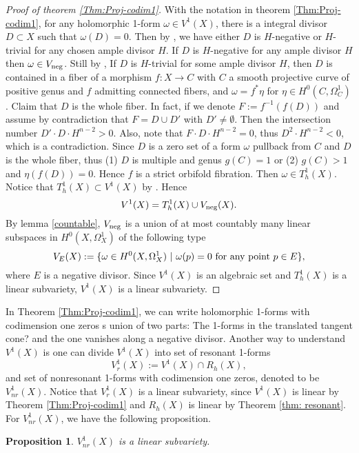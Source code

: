 \documentclass[a4paper,12pt,reqno]{amsart}
\theoremstyle{plain}
\newtheorem{proposition}[theorem]{Proposition}
\theoremstyle{remark}
\begin{document}
\begin{proof}[Proof  of theorem \ref{Thm:Proj-codim1}]
With the notation in theorem \ref{Thm:Proj-codim1},  for any holomorphic 1-form $\omega\in V^1(X)$, there is a integral divisor $D\subset X$ such that $\omega(D)=0$. Then by \cite[theorem 2]{Sp88}, we have either $D$ is $H$-negative or $H$-trivial for any chosen ample divisor $H$. If $D$ is $H$-negative for any ample divisor $H$ then $\omega\in V_{\textnormal{neg}}$. Still by \cite[theorem 2]{Sp88}, If $D$ is $H$-trivial for some ample divisor $H$, then $D$ is contained in a fiber of a morphism $f: X\to C$ with $C$ a smooth projective curve of positive genus and $f$ admitting connected fibers, and $\omega=f^*\eta$ for $\eta\in H^0(C, \Omega_C^1)$. Claim that $D$ is the whole fiber. In fact, if we denote $F:=f^{-1}(f(D))$ and assume by contradiction that $F=D\cup D'$ with $D'\not=\emptyset$. Then the intersection number $D'\cdot D\cdot H^{n-2}>0$. Also, note that $F\cdot D\cdot H^{n-2}=0$, thus $D^2\cdot H^{n-2}<0$, which is a contradiction. Since $D$ is a zero set of a form $\omega$ pullback from $C$ and $D$ is the whole fiber, thus (1) $D$ is multiple and genus $g(C)=1$ or (2) $g(C)>1$ and $\eta(f(D))=0$. Hence $f$ is a strict orbifold fibration. Then $\omega\in T_h^1(X)$. Notice that $T_h^1(X)\subset V^1(X)$ by \cite{GL87}. Hence $$V^1(X)= T_h^1(X)\cup V_{\textnormal{neg}}(X).
$$
By lemma \ref{countable}, $V_{\textnormal{neg}}$ is a union of at most countably many linear subspaces in $H^0(X, \Omega_X^1)$ of the following type $$V_E(X):=\{\omega\in H^0(X, \Omega_X^1)\ |\ \omega(p)=0\  \textnormal{for any point}\ p\in E\},$$ where $E$ is a negative divisor. Since $V^1(X)$ is an algebraic set and $T_h^1(X)$ is a linear subvariety, $V^1(X)$ is a linear subvariety.
 \end{proof} 
 
 In Theorem \ref{Thm:Proj-codim1}, we can write holomorphic 1-forms with codimension one zeros s union of two parts: The 1-forms in the {\color{red} translated tangent cone?} and the one vanishes along a negative divisor.  Another way to understand  $V^1(X)$ is one can divide $V^1(X)$ into set of resonant 1-forms $$V^1_r(X):=V^1(X)\cap R_h(X),$$ and set of nonresonant 1-forms with codimension one zeros, denoted to be $V^1_{nr}(X)$. Notice that $V_r^1(X)$ is a linear subvariety, since $V^1(X)$ is linear by Theorem \ref{Thm:Proj-codim1}  and $R_h(X)$ is linear by Theorem \ref{thm: resonant}. For $V^1_{nr}(X)$, we have the following proposition.
 \begin{proposition}
 $V^1_{nr}(X)$ is a linear subvariety.
 \end{proposition}
 
\end{document}
